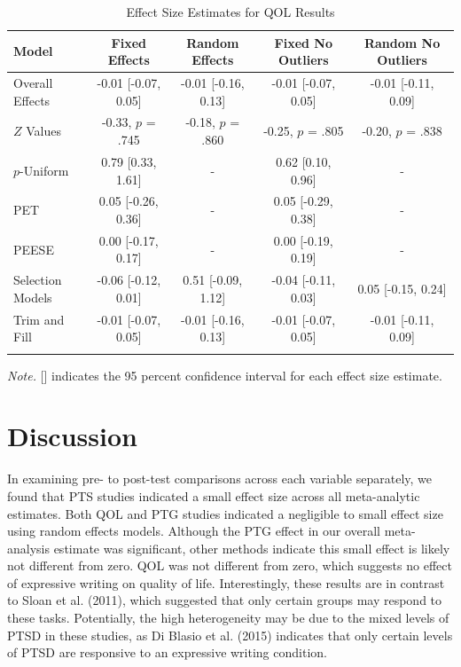 \documentclass[english,man, mask]{apa6}
\theoremstyle{definition}
\theoremstyle{definition}
\theoremstyle{definition}
\theoremstyle{remark}
\begin{document}
\begin{table}[tbp]
\begin{center}
\begin{threeparttable}
\caption{\label{tab:QOLtable}Effect Size Estimates for QOL Results}
\small{
\begin{tabular}{lcccc}
\toprule
Model & Fixed Effects & Random Effects & Fixed No Outliers & Random No Outliers\\
\midrule
Overall Effects & -0.01 [-0.07, 0.05] & -0.01 [-0.16, 0.13] & -0.01 [-0.07, 0.05] & -0.01 [-0.11, 0.09]\\
$Z$ Values & -0.33, $p$ = .745 & -0.18, $p$ = .860 & -0.25, $p$ = .805 & -0.20, $p$ = .838\\
$p$-Uniform & 0.79 [0.33, 1.61] & - & 0.62 [0.10, 0.96] & -\\
PET & 0.05 [-0.26, 0.36] & - & 0.05 [-0.29, 0.38] & -\\
PEESE & 0.00 [-0.17, 0.17] & - & 0.00 [-0.19, 0.19] & -\\
Selection Models & -0.06 [-0.12, 0.01] & 0.51 [-0.09, 1.12] & -0.04 [-0.11, 0.03] & 0.05 [-0.15, 0.24]\\
Trim and Fill & -0.01 [-0.07, 0.05] & -0.01 [-0.16, 0.13] & -0.01 [-0.07, 0.05] & -0.01 [-0.11, 0.09]\\
\bottomrule
\addlinespace
\end{tabular}
}
\begin{tablenotes}[para]
\textit{Note.} [] indicates the 95 percent confidence interval for each effect size estimate.
\end{tablenotes}
\end{threeparttable}
\end{center}
\end{table}

\section{Discussion}\label{discussion}

In examining pre- to post-test comparisons across each variable
separately, we found that PTS studies indicated a small effect size
across all meta-analytic estimates. Both QOL and PTG studies indicated a
negligible to small effect size using random effects models. Although
the PTG effect in our overall meta-analysis estimate was significant,
other methods indicate this small effect is likely not different from
zero. QOL was not different from zero, which suggests no effect of
expressive writing on quality of life. Interestingly, these results are
in contrast to Sloan et al. (2011), which suggested that only certain
groups may respond to these tasks. Potentially, the high heterogeneity
may be due to the mixed levels of PTSD in these studies, as Di Blasio et
al. (2015) indicates that only certain levels of PTSD are responsive to
an expressive writing condition.
\end{document}
